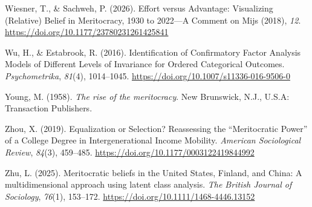 \documentclass[
  13pt,
]{article}
\newlength{\cslhangindent}
\newenvironment{CSLReferences}[2] %
 {\begin{list}{}{%
  \setlength{\itemindent}{0pt}
  \setlength{\leftmargin}{0pt}
  \setlength{\parsep}{0pt}
  \ifodd #1
   \setlength{\leftmargin}{\cslhangindent}
   \setlength{\itemindent}{-1\cslhangindent}
  \fi
  \setlength{\itemsep}{#2\baselineskip}}}
 {\end{list}}
\begin{document}
\begin{CSLReferences}{1}{0}
Wiesner, T., \& Sachweh, P. (2026). Effort versus {Advantage}:
{Visualizing} ({Relative}) {Belief} in {Meritocracy}, 1930 to 2022---{A
Comment} on {Mijs} (2018), \emph{12}.
\url{https://doi.org/10.1177/23780231261425841}

Wu, H., \& Estabrook, R. (2016). Identification of {Confirmatory Factor
Analysis Models} of {Different Levels} of {Invariance} for {Ordered
Categorical Outcomes}. \emph{Psychometrika}, \emph{81}(4), 1014--1045.
\url{https://doi.org/10.1007/s11336-016-9506-0}

Young, M. (1958). \emph{The rise of the meritocracy}. New Brunswick,
N.J., U.S.A: Transaction Publishers.

Zhou, X. (2019). Equalization or {Selection}? {Reassessing} the
{``{Meritocratic Power}''} of a {College Degree} in {Intergenerational
Income Mobility}. \emph{American Sociological Review}, \emph{84}(3),
459--485. \url{https://doi.org/10.1177/0003122419844992}

Zhu, L. (2025). Meritocratic beliefs in the {United States}, {Finland},
and {China}: {A} multidimensional approach using latent class analysis.
\emph{The British Journal of Sociology}, \emph{76}(1), 153--172.
\url{https://doi.org/10.1111/1468-4446.13152}

\end{CSLReferences}
\end{document}
